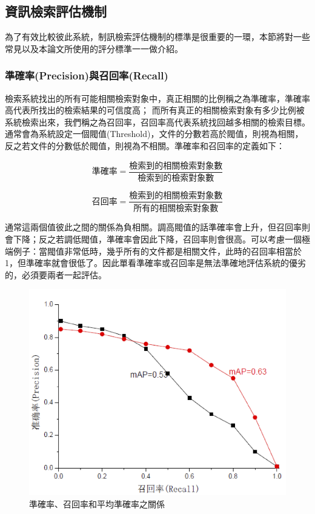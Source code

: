 \vspace{20mm}
\subsection{資訊檢索評估機制}
為了有效比較彼此系統，制訊檢索評估機制的標準是很重要的一環，本節將對一些常見以及本論文所使用的評分標準一一做介紹。

\subsubsection{準確率(Precision)與召回率(Recall)}
檢索系統找出的所有可能相關檢索對象中，真正相關的比例稱之為準確率，準確率高代表所找出的檢索結果的可信度高；
而所有真正的相關檢索對象有多少比例被系統檢索出來，我們稱之為召回率，召回率高代表系統找回越多相關的檢索目標。通常會為系統設定一個閥值(Threshold)，文件的分數若高於閥值，則視為相關，反之若文件的分數低於閥值，則視為不相關。準確率和召回率的定義如下：

\[
\text{準確率}=\frac{\text{檢索到的相關檢索對象數}}{\text{檢索到的檢索對象數}}
\]

\[
\text{召回率}=\frac{\text{檢索到的相關檢索對象數}}{\text{所有的相關檢索對象數}}
\]

通常這兩個值彼此之間的關係為負相關。調高閥值的話準確率會上升，但召回率則會下降；反之若調低閥值，準確率會因此下降，召回率則會很高。可以考慮一個極端例子：當閥值非常低時，幾乎所有的文件都是相關文件，此時的召回率相當於1，但準確率就會很低了。因此單看準確率或召回率是無法準確地評估系統的優劣的，必須要兩者一起評估。

\begin{figure}
\centering
\includegraphics[scale=0.5]{images/chap2_precision_recall.png}
\caption{準確率、召回率和平均準確率之關係} \label{fig:precision_recall}
\end{figure}

